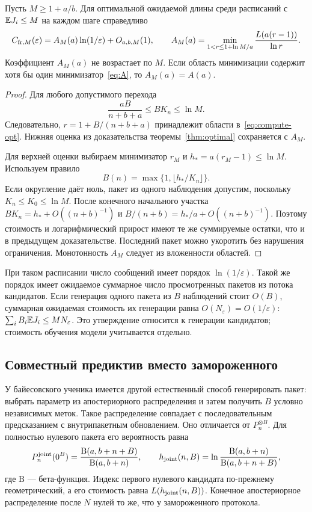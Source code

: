 \begin{theorem}
\label{thm:compute}
Пусть $M\ge1+a/b$. Для оптимальной ожидаемой длины среди расписаний с
$\mathbb E J_i\le M$ на каждом шаге справедливо
\begin{equation}
 C_{{\rm fr},M}(\varepsilon)
 =A_M(a)\ln(1/\varepsilon)+O_{a,b,M}(1),\qquad
 A_M(a)=\min_{1<r\le1+\ln M/a}
       \frac{L(a(r-1))}{\ln r}.
 \label{eq:compute-opt}
\end{equation}
Коэффициент $A_M(a)$ не возрастает по $M$. Если область минимизации содержит
хотя бы один минимизатор~\eqref{eq:A}, то $A_M(a)=A(a)$.
\end{theorem}
\begin{proof}
Для любого допустимого перехода
\[
 \frac{aB}{n+b+a}\le BK_n\le\ln M.
\]
Следовательно, $r=1+B/(n+b+a)$ принадлежит области в~\eqref{eq:compute-opt}.
Нижняя оценка из доказательства теоремы~\ref{thm:optimal} сохраняется с $A_M$.

Для верхней оценки выбираем минимизатор $r_M$ и $h_*=a(r_M-1)\le\ln M$.
Используем правило
\[
 B(n)=\max\{1,\lfloor h_*/K_n\rfloor\}.
\]
Если округление даёт ноль, пакет из одного наблюдения допустим, поскольку
$K_n\le K_0\le\ln M$. После конечного начального участка
$BK_n=h_*+O((n+b)^{-1})$ и
$B/(n+b)=h_*/a+O((n+b)^{-1})$.
Поэтому стоимость и логарифмический прирост имеют те же суммируемые остатки,
что и в предыдущем доказательстве. Последний пакет можно укоротить без
нарушения ограничения. Монотонность $A_M$ следует из вложенности областей.
\end{proof}

При таком расписании число сообщений имеет порядок $\ln(1/\varepsilon)$.
Такой же порядок имеет ожидаемое суммарное число просмотренных пакетов
из потока кандидатов.
Если генерация одного пакета из $B$ наблюдений стоит $O(B)$, суммарная
ожидаемая стоимость их генерации равна $O(N_\varepsilon)=O(1/\varepsilon)$:
$\sum_i B_i\mathbb E J_i\le MN_\varepsilon$. Это утверждение относится к генерации
кандидатов; стоимость обучения модели учитывается отдельно.

\subsection{Совместный предиктив вместо замороженного}

У байесовского ученика имеется другой естественный способ генерировать пакет:
выбрать параметр из апостериорного распределения и затем получить $B$
условно независимых меток.
Такое распределение совпадает с последовательным предсказанием с
внутрипакетным обновлением. Оно отличается от $P_n^{\otimes B}$.
Для полностью нулевого пакета его вероятность равна
\begin{equation}
 P_n^{\rm joint}(0^B)=\frac{\mathrm B(a,b+n+B)}{\mathrm B(a,b+n)},\qquad
 h_{\rm joint}(n,B)=\ln\frac{\mathrm B(a,b+n)}{\mathrm B(a,b+n+B)},
 \label{eq:joint}
\end{equation}
где $\mathrm B$ --- бета-функция. Индекс первого нулевого кандидата по-прежнему
геометрический, а его стоимость равна $L(h_{\rm joint}(n,B))$.
Конечное апостериорное распределение после $N$ нулей то же, что у замороженного
протокола.

